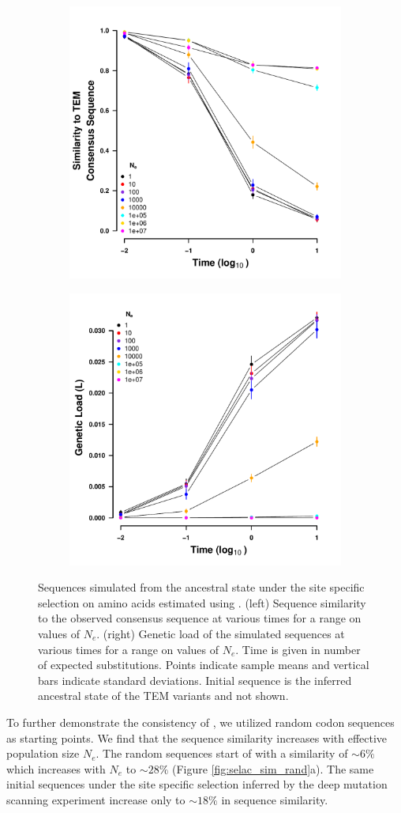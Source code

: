 \documentclass[12pt]{article}
\begin{document}
\begin{figure}[h]
    \centering
    \begin{subfigure}
        \centering
        \includegraphics[width=.45\textwidth]{img/simulated_dist_time_SELAC_ancest.pdf}
    \end{subfigure}
    \begin{subfigure}
        \centering
        \includegraphics[width=.45\textwidth]{img/simulated_gl_time_SELAC_ancest.pdf}
    \end{subfigure}
    \caption{Sequences simulated from the ancestral state under the site specific selection on amino acids estimated using \selac. 
    (left) Sequence similarity to the observed consensus sequence at various times for a range on values of $N_e$.
    (right) Genetic load of the simulated sequences at various times for a range on values of $N_e$.
    Time is given in number of expected substitutions.
    Points indicate sample means and vertical bars indicate standard deviations. Initial sequence is the inferred ancestral state of the TEM variants and not shown.}
    \label{fig:selac_sim}
\end{figure}

To further demonstrate the consistency of \selac, we utilized random codon sequences as starting points.
We find that the sequence similarity increases with effective population size $N_e$.
The random sequences start of with a similarity of $\sim6 \%$ which increases with $N_e$ to $\sim28 \%$ (Figure \ref{fig:selac_sim_rand}a).
The same initial sequences under the site specific selection inferred by the deep mutation scanning experiment increase only to $\sim18 \%$ in sequence similarity.
\end{document}
